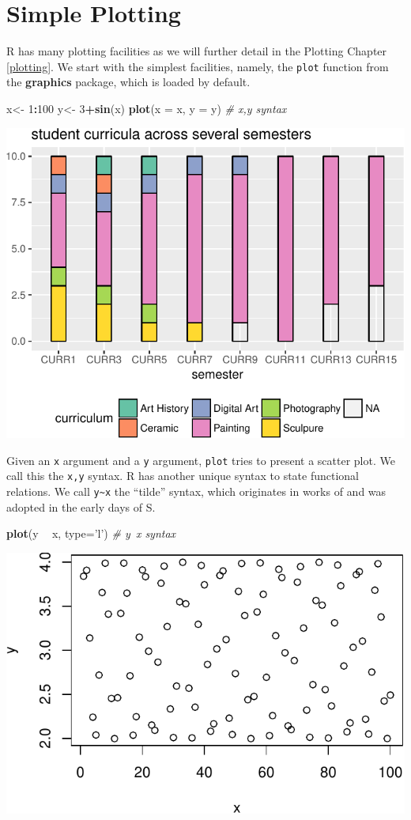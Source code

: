 \documentclass[]{book}
\newenvironment{Shaded}{\begin{snugshade}}{\end{snugshade}}
\newcommand{\KeywordTok}[1]{\textcolor[rgb]{0.13,0.29,0.53}{\textbf{#1}}}
\newcommand{\DataTypeTok}[1]{\textcolor[rgb]{0.13,0.29,0.53}{#1}}
\newcommand{\DecValTok}[1]{\textcolor[rgb]{0.00,0.00,0.81}{#1}}
\newcommand{\StringTok}[1]{\textcolor[rgb]{0.31,0.60,0.02}{#1}}
\newcommand{\CommentTok}[1]{\textcolor[rgb]{0.56,0.35,0.01}{\textit{#1}}}
\newcommand{\OperatorTok}[1]{\textcolor[rgb]{0.81,0.36,0.00}{\textbf{#1}}}
\newcommand{\NormalTok}[1]{#1}
\theoremstyle{definition}
\theoremstyle{definition}
\theoremstyle{definition}
\theoremstyle{remark}
\begin{document}
\section{Simple Plotting}\label{simple-plotting}

R has many plotting facilities as we will further detail in the Plotting
Chapter \ref{plotting}. We start with the simplest facilities, namely,
the \texttt{plot} function from the \textbf{graphics} package, which is
loaded by default.

\begin{Shaded}
\begin{Highlighting}[]
\NormalTok{x<-}\StringTok{ }\DecValTok{1}\OperatorTok{:}\DecValTok{100}
\NormalTok{y<-}\StringTok{ }\DecValTok{3}\OperatorTok{+}\KeywordTok{sin}\NormalTok{(x) }
\KeywordTok{plot}\NormalTok{(}\DataTypeTok{x =}\NormalTok{ x, }\DataTypeTok{y =}\NormalTok{ y) }\CommentTok{# x,y syntax                         }
\end{Highlighting}
\end{Shaded}

\includegraphics[width=0.5\linewidth]{Rcourse_files/figure-latex/unnamed-chunk-32-1}

Given an \texttt{x} argument and a \texttt{y} argument, \texttt{plot}
tries to present a scatter plot. We call this the \texttt{x,y} syntax. R
has another unique syntax to state functional relations. We call
\texttt{y\textasciitilde{}x} the ``tilde'' syntax, which originates in
works of \citet{wilkinson1973symbolic} and was adopted in the early days
of S.

\begin{Shaded}
\begin{Highlighting}[]
\KeywordTok{plot}\NormalTok{(y }\OperatorTok{~}\StringTok{ }\NormalTok{x, }\DataTypeTok{type=}\StringTok{'l'}\NormalTok{) }\CommentTok{# y~x syntax }
\end{Highlighting}
\end{Shaded}

\includegraphics[width=0.5\linewidth]{Rcourse_files/figure-latex/unnamed-chunk-33-1}
\end{document}
